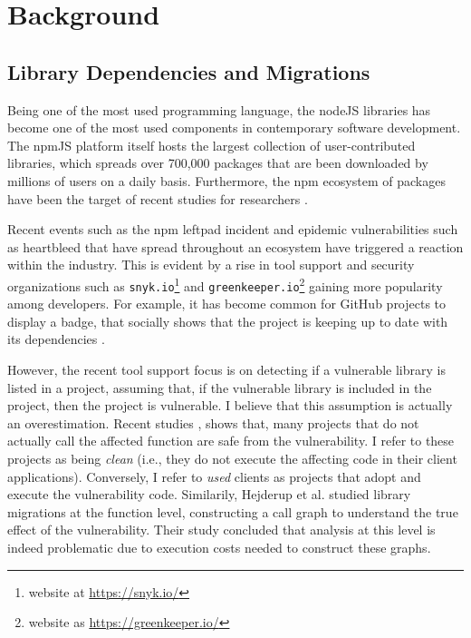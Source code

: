 \chapter{Background}
\label{sec:background}
\section{Library Dependencies and Migrations}
Being one of the most used programming language, the nodeJS libraries has become one of the most used components in contemporary software development.
The npmJS platform itself hosts the largest collection of user-contributed libraries, which spreads over 700,000 packages that are been downloaded by millions of users on a daily basis. 
Furthermore, the npm ecosystem of packages have been the target of recent studies for researchers \cite{Wittern:2016,Kikas:2017,decan2018impact}.

Recent events such as the npm leftpad incident \cite{Web:left-pad} and epidemic vulnerabilities such as heartbleed \cite{Web:heartbleed} that have spread throughout an ecosystem have triggered a reaction within the industry.
This is evident by a rise in tool support and security organizations such as \texttt{snyk.io}\footnote{website at \url{https://snyk.io/}} and \texttt{greenkeeper.io}\footnote{website as \url{https://greenkeeper.io/}} gaining more popularity among developers.
For example, it has become common for GitHub projects to display a badge, that socially shows that the project is keeping up to date with its dependencies \cite{Trockman:2018,Mirhosseini:2017}.

However, the recent tool support focus is on detecting if a vulnerable library is listed in a project, assuming that, if the vulnerable library is included in the project, then the project is vulnerable. I believe that this assumption is actually an overestimation.
Recent studies \cite{Hejderup:2018}, \cite{Ponta:2018} shows that, many projects that do not actually call the affected function are safe from the vulnerability. I refer to these projects as being \textit{clean} (i.e., they do not execute the affecting code in their client applications).
Conversely, I refer to \textit{used} clients as projects that adopt and execute the vulnerability code.
Similarily, Hejderup et al. studied library migrations at the function level, constructing a call graph to understand the true effect of the vulnerability. 
Their study concluded that analysis at this level is indeed problematic due to execution costs needed to construct these graphs.

